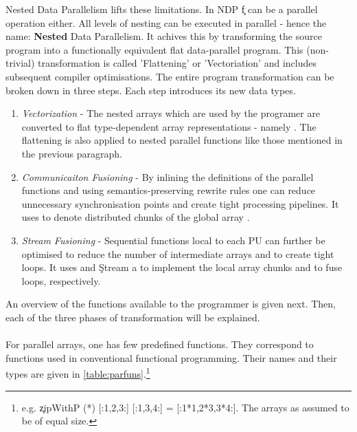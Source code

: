     Nested Data Parallelism lifts these limitations.
    In NDP \c{f} can be a parallel operation either. All levels of nesting can
    be executed in parallel - hence the name: \textbf{Nested} Data Parallelism.
    It achives this by transforming the source program into a functionally
    equivalent flat data-parallel program. This (non-trivial) transformation
    is called 'Flattening' or 'Vectoriation' and includes subsequent compiler optimisations.
    The entire program transformation can be broken down in three steps.
    Each step introduces its new data types.
    \begin{enumerate}
      \item \emph{Vectorization} -
        The nested arrays \pan{} which are used by the programer
        are converted to flat type-dependent array representations - namely  \pav{}.
        The flattening is also applied to nested parallel functions like
        those mentioned in the previous paragraph.
      \item \emph{Communicaiton Fusioning} -
        By inlining the definitions of the parallel functions and
        using semantics-preserving rewrite rules one can
        reduce unnecessary synchronisation points and
        create tight processing pipelines. It uses \pad{} to denote
        distributed chunks of the global array \pav{}.
      \item \emph{Stream Fusioning} -
        Sequential functions local to each PU can further
        be optimised to reduce the number of intermediate arrays
        and to create tight loops.
        It uses  and \c{Stream a} to
        implement the local array chunks and to fuse loops, respectively.
    \end{enumerate}
    
  An overview of the functions available to the programmer is given next.
  Then, each of the three phases of transformation will be explained.
  
  \paragraph{}
    For parallel arrays, one has few predefined functions.
    They correspond to functions used in conventional functional programming.
    Their names and their types are given in \ref{table:parfuns}.\footnote{e.g. \c{zipWithP (*) [:1,2,3:] [:1,3,4:] = [:1*1,2*3,3*4:]}. The arrays as assumed to be of equal size.}
    
